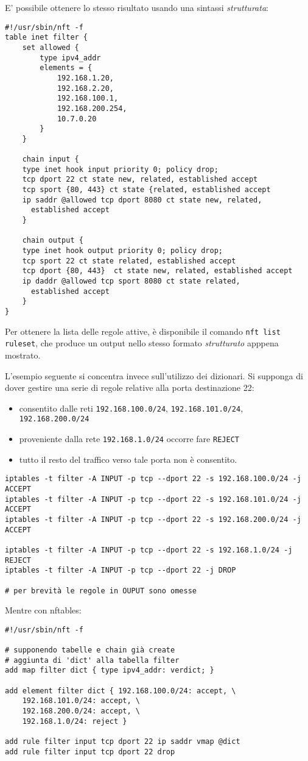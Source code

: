 E' possibile ottenere lo stesso risultato usando una sintassi \textit{strutturata}:
\begin{verbatim}
#!/usr/sbin/nft -f
table inet filter {
	set allowed {
		type ipv4_addr
		elements = {
			192.168.1.20,
			192.168.2.20,
			192.168.100.1,
			192.168.200.254,
			10.7.0.20
		}
	}
		
	chain input {
    type inet hook input priority 0; policy drop;
    tcp dport 22 ct state new, related, established accept
    tcp sport {80, 443} ct state {related, established accept
    ip saddr @allowed tcp dport 8080 ct state new, related,
      established accept
	}
			
	chain output {
    type inet hook output priority 0; policy drop;
    tcp sport 22 ct state related, established accept
    tcp dport {80, 443}  ct state new, related, established accept
    ip daddr @allowed tcp sport 8080 ct state related,
      established accept
	}
}
	\end{verbatim}
	Per ottenere la lista delle regole attive, è disponibile il comando
	\texttt{nft list ruleset}, che produce un output nello stesso formato \textit{strutturato}
	apppena mostrato.
	
	L'esempio seguente si concentra invece sull'utilizzo dei dizionari.
	Si supponga di dover gestire una serie di regole relative alla porta destinazione 22:
	\begin{itemize}
		\item consentito dalle reti \texttt{192.168.100.0/24}, \texttt{192.168.101.0/24},
		      \texttt{192.168.200.0/24}
		\item proveniente dalla rete \texttt{192.168.1.0/24} occorre fare \texttt{REJECT}
		\item tutto il resto del traffico verso tale porta non è consentito.
	\end{itemize}
\begin{verbatim}
iptables -t filter -A INPUT -p tcp --dport 22 -s 192.168.100.0/24 -j ACCEPT
iptables -t filter -A INPUT -p tcp --dport 22 -s 192.168.101.0/24 -j ACCEPT
iptables -t filter -A INPUT -p tcp --dport 22 -s 192.168.200.0/24 -j ACCEPT
		
iptables -t filter -A INPUT -p tcp --dport 22 -s 192.168.1.0/24 -j REJECT
iptables -t filter -A INPUT -p tcp --dport 22 -j DROP
		
# per brevità le regole in OUPUT sono omesse
\end{verbatim}
	Mentre con nftables:
\begin{verbatim}
#!/usr/sbin/nft -f
		
# supponendo tabelle e chain già create
# aggiunta di 'dict' alla tabella filter
add map filter dict { type ipv4_addr: verdict; }
		
add element filter dict { 192.168.100.0/24: accept, \
	192.168.101.0/24: accept, \
	192.168.200.0/24: accept, \
	192.168.1.0/24: reject }
		
add rule filter input tcp dport 22 ip saddr vmap @dict
add rule filter input tcp dport 22 drop
\end{verbatim}
